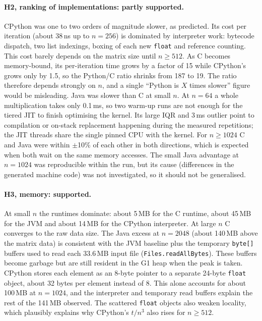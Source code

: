 \documentclass[11pt,a4paper]{article}
\begin{document}
\paragraph{H2, ranking of implementations: partly supported.} CPython was one to two orders of
magnitude slower, as predicted. Its cost per iteration (about 38\,ns up to $n = 256$) is dominated by
interpreter work: bytecode dispatch, two list indexings, boxing of each new \texttt{float} and
reference counting. This cost barely depends on the matrix size until $n \ge 512$. As C becomes
memory-bound, its per-iteration time grows by a factor of 15 while CPython's grows only by 1.5, so the Python/C
ratio shrinks from 187 to 19. The ratio therefore depends strongly on $n$, and a single ``Python is
$X$ times slower'' figure would be misleading. Java was slower than C at small $n$. At $n = 64$ a whole
multiplication takes only 0.1\,ms, so two warm-up runs are not enough for the tiered JIT to finish
optimising the kernel. Its large IQR and 3\,ms outlier point to compilation or on-stack
replacement happening during the measured repetitions; the JIT threads share the single pinned
CPU with the kernel. For $n \ge 1024$ C and Java were within $\pm$10\% of each other in both
directions, which is expected when both wait on the same memory accesses. The small Java advantage at
$n = 1024$ was reproducible within the run, but its cause (differences in the generated machine
code) was not investigated, so it should not be generalised.

\paragraph{H3, memory: supported.} At small $n$ the runtimes dominate: about 5\,MB for the C runtime,
about 45\,MB for the JVM and about 14\,MB for the CPython interpreter. At large $n$ C converges to the raw
data size. The Java excess at $n = 2048$ (about 140\,MB above the matrix data) is consistent with the
JVM baseline plus the temporary \texttt{byte[]} buffers used to read each 33.6\,MB input file
(\texttt{Files.readAllBytes}). These buffers become garbage but are still resident in the G1 heap
when the peak is taken. CPython stores each element as an 8-byte pointer to a separate 24-byte
\texttt{float} object, about 32 bytes per element instead of 8. This alone accounts for about
100\,MB at $n = 1024$, and the interpreter and temporary read buffers explain the rest of the
141\,MB observed. The scattered \texttt{float} objects also weaken locality, which plausibly explains why
CPython's $t/n^3$ also rises for $n \ge 512$.
\end{document}
